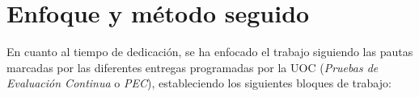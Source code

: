 \documentclass[IB,BIB]{TFUOC}%
\begin{document}
% 
% 


\section{Enfoque y método seguido}
\label{sec:Enfoque y método seguido}





%

En cuanto al tiempo de dedicación, se ha enfocado el trabajo siguiendo las pautas marcadas por las diferentes entregas programadas por la UOC (\textit{Pruebas de Evaluación Continua} o \textit{PEC}), estableciendo los siguientes bloques de trabajo:
\end{document}
